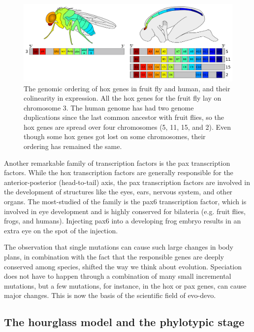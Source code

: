 \begin{figure}
    \center
    \includegraphics[width=\linewidth]{ch.introduction/imgs/hox.png}
    \caption{The genomic ordering of hox genes in fruit fly and human, and their colinearity in expression. All the hox genes for the fruit fly lay on chromosome 3. The human genome has had two genome duplications since the last common ancestor with fruit flies, so the hox genes are spread over four chromosomes (5, 11, 15, and 2). Even though some hox genes got lost on some chromosomes, their ordering has remained the same.}
    \label{fig:hox}
\end{figure}

Another remarkable family of transcription factors is the pax transcription factors. While the hox transcription factors are generally responsible for the anterior-posterior (head-to-tail) axis, the pax transcription factors are involved in the development of structures like the eyes, ears, nervous system, and other organs. The most-studied of the family is the pax6 transcription factor, which is involved in eye development and is highly conserved for bilateria (e.g. fruit flies, frogs, and humans). Injecting pax6 into a developing frog embryo results in an extra eye on the spot of the injection\cite{Chow1999}.

The observation that single mutations can cause such large changes in body plans, in combination with the fact that the responsible genes are deeply conserved among species, shifted the way we think about evolution. Speciation does not have to happen through a combination of many small incremental mutations, but a few mutations, for instance, in the hox or pax genes, can cause major changes. This is now the basis of the scientific field of evo-devo.

\subsection{The hourglass model and the phylotypic stage}

